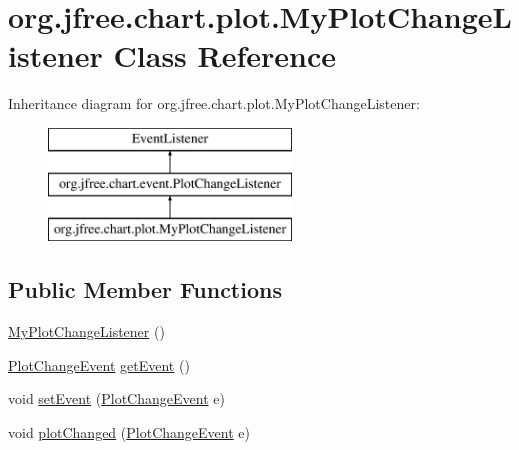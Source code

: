 \hypertarget{classorg_1_1jfree_1_1chart_1_1plot_1_1_my_plot_change_listener}{}\section{org.\+jfree.\+chart.\+plot.\+My\+Plot\+Change\+Listener Class Reference}
\label{classorg_1_1jfree_1_1chart_1_1plot_1_1_my_plot_change_listener}
Inheritance diagram for org.\+jfree.\+chart.\+plot.\+My\+Plot\+Change\+Listener\+:\begin{figure}[H]
\begin{center}
\leavevmode
\includegraphics[height=3.000000cm]{classorg_1_1jfree_1_1chart_1_1plot_1_1_my_plot_change_listener}
\end{center}
\end{figure}
\subsection*{Public Member Functions}
\begin{DoxyCompactItemize}
\item 
\mbox{\hyperlink{classorg_1_1jfree_1_1chart_1_1plot_1_1_my_plot_change_listener_a42b41f133a9d702126d2e3048465a8ea}{My\+Plot\+Change\+Listener}} ()
\item 
\mbox{\hyperlink{classorg_1_1jfree_1_1chart_1_1event_1_1_plot_change_event}{Plot\+Change\+Event}} \mbox{\hyperlink{classorg_1_1jfree_1_1chart_1_1plot_1_1_my_plot_change_listener_ac904d6d3b65e803ced4bfb00364c4cc6}{get\+Event}} ()
\item 
void \mbox{\hyperlink{classorg_1_1jfree_1_1chart_1_1plot_1_1_my_plot_change_listener_a5e8539a610a67c675bf6f3f398b93ca0}{set\+Event}} (\mbox{\hyperlink{classorg_1_1jfree_1_1chart_1_1event_1_1_plot_change_event}{Plot\+Change\+Event}} e)
\item 
void \mbox{\hyperlink{classorg_1_1jfree_1_1chart_1_1plot_1_1_my_plot_change_listener_af86664f5f5b66e7d8e0f3940f3bcbfb2}{plot\+Changed}} (\mbox{\hyperlink{classorg_1_1jfree_1_1chart_1_1event_1_1_plot_change_event}{Plot\+Change\+Event}} e)
\end{DoxyCompactItemize}


